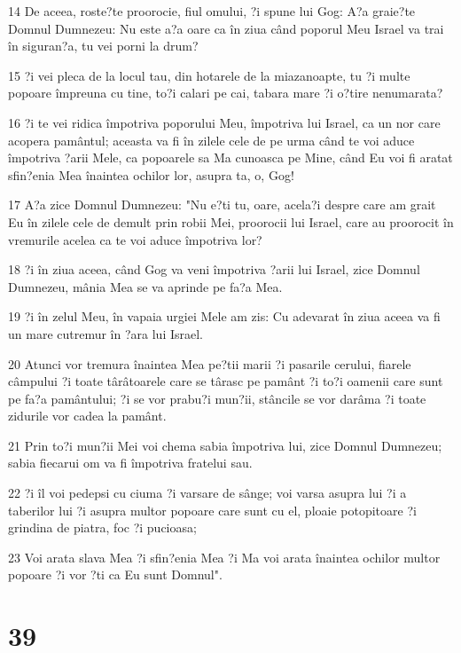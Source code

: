 \par 14 De aceea, roste?te proorocie, fiul omului, ?i spune lui Gog: A?a graie?te Domnul Dumnezeu: Nu este a?a oare ca în ziua când poporul Meu Israel va trai în siguran?a, tu vei porni la drum?
\par 15 ?i vei pleca de la locul tau, din hotarele de la miazanoapte, tu ?i multe popoare împreuna cu tine, to?i calari pe cai, tabara mare ?i o?tire nenumarata?
\par 16 ?i te vei ridica împotriva poporului Meu, împotriva lui Israel, ca un nor care acopera pamântul; aceasta va fi în zilele cele de pe urma când te voi aduce împotriva ?arii Mele, ca popoarele sa Ma cunoasca pe Mine, când Eu voi fi aratat sfin?enia Mea înaintea ochilor lor, asupra ta, o, Gog!
\par 17 A?a zice Domnul Dumnezeu: "Nu e?ti tu, oare, acela?i despre care am grait Eu în zilele cele de demult prin robii Mei, proorocii lui Israel, care au proorocit în vremurile acelea ca te voi aduce împotriva lor?
\par 18 ?i în ziua aceea, când Gog va veni împotriva ?arii lui Israel, zice Domnul Dumnezeu, mânia Mea se va aprinde pe fa?a Mea.
\par 19 ?i în zelul Meu, în vapaia urgiei Mele am zis: Cu adevarat în ziua aceea va fi un mare cutremur în ?ara lui Israel.
\par 20 Atunci vor tremura înaintea Mea pe?tii marii ?i pasarile cerului, fiarele câmpului ?i toate târâtoarele care se târasc pe pamânt ?i to?i oamenii care sunt pe fa?a pamântului; ?i se vor prabu?i mun?ii, stâncile se vor darâma ?i toate zidurile vor cadea la pamânt.
\par 21 Prin to?i mun?ii Mei voi chema sabia împotriva lui, zice Domnul Dumnezeu; sabia fiecarui om va fi împotriva fratelui sau.
\par 22 ?i îl voi pedepsi cu ciuma ?i varsare de sânge; voi varsa asupra lui ?i a taberilor lui ?i asupra multor popoare care sunt cu el, ploaie potopitoare ?i grindina de piatra, foc ?i pucioasa;
\par 23 Voi arata slava Mea ?i sfin?enia Mea ?i Ma voi arata înaintea ochilor multor popoare ?i vor ?ti ca Eu sunt Domnul".

\chapter{39}

